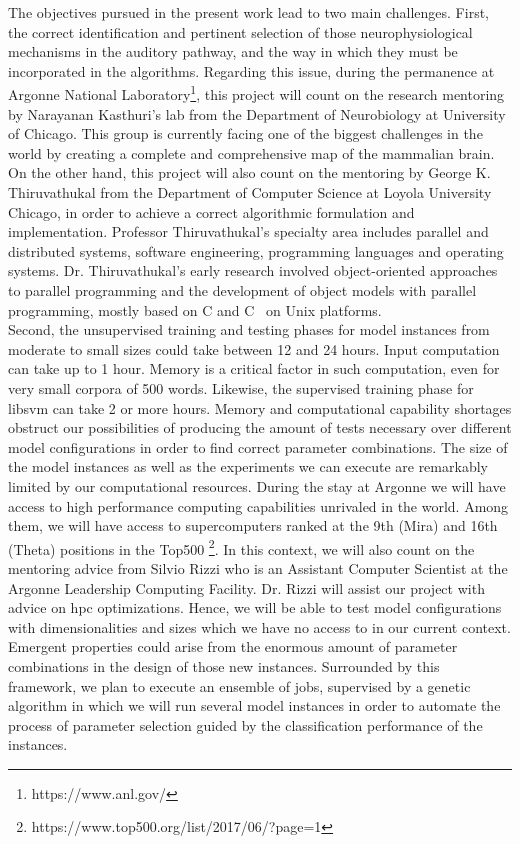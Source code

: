 \documentclass[11pt,a4paper]{article}
\newcommand{\CC}{C\nolinebreak\hspace{-.05em}\raisebox{.4ex}{\tiny\bf +}\nolinebreak\hspace{-.10em}\raisebox{.4ex}{\tiny\bf +}}
\begin{document}
The objectives pursued in the present work lead to two main challenges.
First, the correct identification and pertinent selection of those neurophysiological
mechanisms in the auditory pathway, and the way in which they must be incorporated
in the algorithms.
Regarding this issue, during the permanence at Argonne National Laboratory\footnote{https://www.anl.gov/},
this project will count on the
research mentoring by Narayanan Kasthuri's lab
from the Department of Neurobiology at University of Chicago.
This group is currently facing one of the biggest challenges in the world by 
creating a complete and comprehensive map of the mammalian brain.
On the other hand, this project will also count on the mentoring by
George K. Thiruvathukal from the Department of Computer Science at
Loyola University Chicago,
in order to achieve a correct algorithmic formulation and implementation.
Professor Thiruvathukal's specialty area includes
parallel and distributed systems, software engineering, programming languages and operating systems.
Dr. Thiruvathukal's early research involved object-oriented approaches to parallel programming
and the development of object models with parallel programming, mostly based on C and \CC
~on Unix platforms. \\

Second, the
unsupervised training and testing phases for model instances from moderate to small sizes
could take between 12 and 24 hours.
Input computation can take up to 1 hour.
Memory is a critical factor in such computation,
even for very small corpora of 500 words.
Likewise, the supervised training phase for \gls{libsvm} can take 2 or more hours.
Memory and computational capability shortages obstruct our possibilities of producing
the amount of tests necessary over different model configurations in order to find correct
parameter combinations.
The size of the model instances as well as the experiments we can execute
are remarkably limited by our computational resources.
During the stay at Argonne we will have access
to high performance computing capabilities unrivaled in the world.
Among them, we will have access to supercomputers
ranked at the 9th (Mira) and 16th (Theta) positions in the Top500
\footnote{https://www.top500.org/list/2017/06/?page=1}.
In this context, we will also count on the mentoring advice from Silvio Rizzi
who is an Assistant Computer Scientist at the Argonne Leadership Computing Facility.
Dr. Rizzi will assist our project with advice on \gls{hpc} optimizations.
Hence, we will be able to test model configurations
with dimensionalities and sizes which we have no access to in our current context.
Emergent properties could arise from the enormous amount of parameter combinations in the design
of those new instances.
Surrounded by this framework, we plan to execute an ensemble of jobs,
supervised by a genetic algorithm in which we will run several model instances
in order to automate the process of parameter selection guided by the
classification performance of the instances. \\
\end{document}
